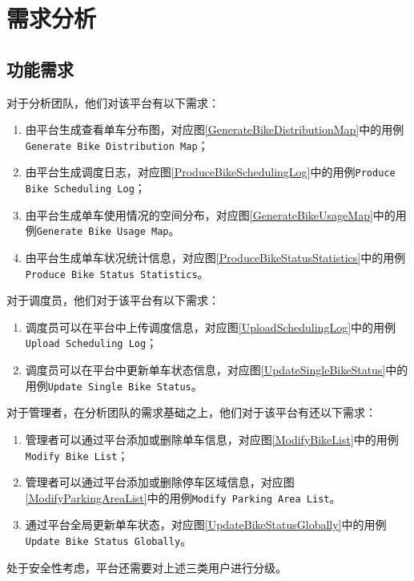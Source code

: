 \chapter{需求分析}\label{chap:feasibility}
\thispagestyle{empty}
\section{功能需求}

对于分析团队，他们对该平台有以下需求：
\begin{enumerate}
    \item 由平台生成查看单车分布图，对应图\ref{GenerateBikeDistributionMap}中的用例\texttt{Generate Bike Distribution Map}；
    \item 由平台生成调度日志，对应图\ref{ProduceBikeSchedulingLog}中的用例\texttt{Produce Bike Scheduling Log}；
    \item 由平台生成单车使用情况的空间分布，对应图\ref{GenerateBikeUsageMap}中的用例\texttt{Generate Bike Usage Map}。
    \item 由平台生成单车状况统计信息，对应图\ref{ProduceBikeStatusStatistics}中的用例\texttt{Produce Bike Status Statistics}。
\end{enumerate}

对于调度员，他们对于该平台有以下需求：
\begin{enumerate}
    \item 调度员可以在平台中上传调度信息，对应图\ref{UploadSchedulingLog}中的用例\texttt{Upload Scheduling Log}；
    \item 调度员可以在平台中更新单车状态信息，对应图\ref{UpdateSingleBikeStatus}中的用例\texttt{Update Single Bike Status}。
\end{enumerate}

对于管理者，在分析团队的需求基础之上，他们对于该平台有还以下需求：
\begin{enumerate}
    \item 管理者可以通过平台添加或删除单车信息，对应图\ref{ModifyBikeList}中的用例\texttt{Modify Bike List}；
    \item 管理者可以通过平台添加或删除停车区域信息，对应图\ref{ModifyParkingAreaList}中的用例\texttt{Modify Parking Area List}。
    \item 通过平台全局更新单车状态，对应图\ref{UpdateBikeStatusGlobally}中的用例\texttt{Update Bike Status Globally}。
\end{enumerate}

处于安全性考虑，平台还需要对上述三类用户进行分级。

